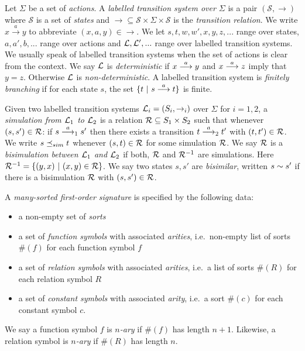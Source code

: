 Let $\Sigma$ be a set of \emph{actions}.  A \emph{labelled transition
  system over $\Sigma$} is a pair $(\mathcal{S}, \rightarrow)$ where
$\mathcal{S}$ is a set of \emph{states} and $\rightarrow \subseteq
\mathcal{S} \times \Sigma \times \mathcal{S}$ is the \emph{transition
  relation}.  We write $x \xrightarrow{a} y$ to abbreviate $(x,a,y)
\in \rightarrow$. We let $s, t, w, w', x, y, z, ...$ range over
states, $a, a', b, ...$ range over actions and $\mathcal{L}, \mathcal{L}', ...$
range over labelled transition systems. We usually speak of labelled
transition systems  when the set of actions is clear from the
context.  We say $\mathcal{L}$ is \emph{deterministic} if $x \stackrel{a}{\longrightarrow} y$ and
$x \stackrel{a}{\longrightarrow} z$ imply that $y = z$. Otherwise $\mathcal{L}$ is
\emph{non-deterministic}.  A labelled transition system is
\emph{finitely branching} if for each state $s$, the set $\{t\ |\ s
\stackrel{a}{\longrightarrow} t\}$ is finite.

Given two labelled transition systems $\mathcal{L}_i = (S_i, \rightarrow_i)$
over $\Sigma$ for $i = 1, 2$, a \emph{simulation from $\mathcal{L}_1$ to
  $\mathcal{L}_2$} is a relation $\mathcal{R} \subseteq S_1 \times S_2$ such that
whenever $(s, s') \in \mathcal{R}$: if $s \stackrel{a}{\longrightarrow}_1 s'$ then there exists a
transition $t \stackrel{a}{\longrightarrow}_2 t'$ with $(t, t') \in \mathcal{R}$.  We write $s \preceq_{sim}
t$ whenever $(s, t) \in \mathcal{R}$ for some simulation $\mathcal{R}$.  We say
$\mathcal{R}$ is a \emph{bisimulation between $\mathcal{L}_1$ and $\mathcal{L}_2$} if both,
$\mathcal{R}$ and $\mathcal{R}^{-1}$ are simulations. Here $\mathcal{R}^{-1} = \{(y,
x)\ |\ (x, y) \in \mathcal{R}\}$.  We say two states $s, s'$ are
\emph{bisimilar}, written $s \sim s'$ if there is a bisimulation
$\mathcal{R}$ with $(s, s') \in \mathcal{R}$.

A \emph{many-sorted first-order signature} is specified by the
following data:
\begin{itemize}
\item 
a non-empty set of \emph{sorts}
\item
a set of \emph{function
  symbols} with associated \emph{arities}, i.e.~non-empty list of
sorts $\#(f)$ for each function symbol $f$
\item
a set of \emph{relation
  symbols} with associated \emph{arities}, i.e.~a list of sorts
$\#(R)$ for each relation symbol $R$
\item
a set of \emph{constant symbols}
with associated \emph{arity}, i.e.~a sort $\#(c)$ for each constant
symbol $c$. 
\end{itemize}
We say a function symbol $f$ is \emph{$n$-ary} if $\#(f)$
has length $n+1$. Likewise, a relation symbol is \emph{$n$-ary} if
$\#(R)$ has length $n$.

